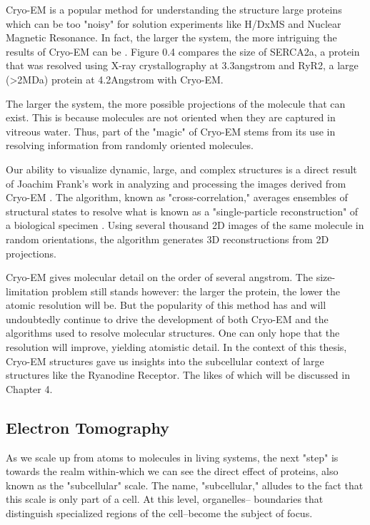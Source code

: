\documentclass[12pt]{ucsddissertation}
\begin{document}
\begin{dissertationintroduction}
Cryo-EM is a popular method for understanding the structure large proteins which can be too "noisy" for solution experiments like H/DxMS and Nuclear Magnetic Resonance\cite{Ishima2000}. In fact, the larger the system, the more intriguing the results of Cryo-EM can be \cite{Frank1995,Lee2015,Sevvana2018}. Figure 0.4 compares the size of SERCA2a, a protein that was resolved using X-ray crystallography at 3.3\si{angstrom} and RyR2, a large (>2MDa) protein at 4.2\si{Angstrom} with Cryo-EM.

The larger the system, the more possible projections of the molecule that can exist. This is because molecules are not oriented when they are captured in vitreous water. Thus, part of the "magic" of Cryo-EM stems from its use in resolving information from randomly oriented molecules. 

Our ability to visualize dynamic, large, and complex structures is a direct result of Joachim Frank's work in analyzing and processing the images derived from Cryo-EM \cite{Frank1970}. The algorithm, known as "cross-correlation," averages ensembles of structural states to resolve what is known as a "single-particle reconstruction" of a biological specimen \cite{Saxton1976}. Using several thousand 2D images of the same molecule in random orientations, the algorithm generates 3D reconstructions from 2D projections\cite{Frank2009}. 

Cryo-EM gives molecular detail on the order of several \si{angstrom}. The size-limitation problem still stands however: the larger the protein, the lower the atomic resolution will be. But the popularity of this method has and will undoubtedly continue to drive the development of both Cryo-EM and the algorithms used to resolve molecular structures. One can only hope that the resolution will improve, yielding atomistic detail. In the context of this thesis, Cryo-EM structures gave us insights into the subcellular context of large structures like the Ryanodine Receptor. The likes of which will be discussed in Chapter 4. 

\subsection{Electron Tomography}
As we scale up from atoms to molecules in living systems, the next "step" is towards the realm within-which we can see the direct effect of proteins, also known as the "subcellular" scale. The name, "subcellular," alludes to the fact that this scale is only part of a cell. At this level, organelles-- boundaries that distinguish specialized regions of the cell--become the subject of focus. 


\end{dissertationintroduction}
\end{document}
